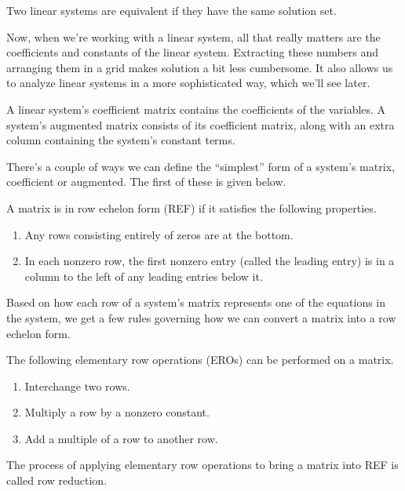 \documentclass[../m073main.tex]{subfiles}
\begin{document}
\begin{definition}
	Two linear systems are equivalent if they have the same solution set.
\end{definition}

Now, when we're working with a linear system, all that really matters are the coefficients and constants of the linear system.
Extracting these numbers and arranging them in a grid makes solution a bit less cumbersome.
It also allows us to analyze linear systems in a more sophisticated way, which we'll see later.

\begin{definition}
	A linear system's coefficient matrix contains the coefficients of the variables.
	A system's augmented matrix consists of its coefficient matrix, along with an extra column containing the system's constant terms.
\end{definition}

There's a couple of ways we can define the ``simplest'' form of a system's matrix, coefficient or augmented.
The first of these is given below.

\begin{definition}
	A matrix is in row echelon form (REF) if it satisfies the following properties.
	\begin{enumerate}
		\item Any rows consisting entirely of zeros are at the bottom.
		\item In each nonzero row, the first nonzero entry (called the leading entry) is in a column to the left of any leading entries below it.
	\end{enumerate}
\end{definition}

Based on how each row of a system's matrix represents one of the equations in the system, we get a few rules governing how we can convert a matrix into a row echelon form.

\begin{definition}
	The following elementary row operations (EROs) can be performed on a matrix.
	\begin{enumerate}
		\item Interchange two rows.
		\item Multiply a row by a nonzero constant.
		\item Add a multiple of a row to another row.
	\end{enumerate}
	The process of applying elementary row operations to bring a matrix into REF is called row reduction.
\end{definition}
\end{document}
